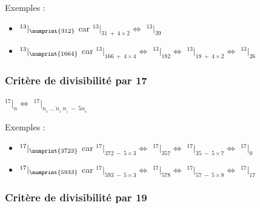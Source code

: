 \documentclass[a4paper, twoside]{article}
\begin{document}
	{ \parindent=0.5cm Exemples : }

	\begin{Large}
	\begin{itemize}

		\item[] $ ^{13}|_{\numprint{312}}$ {\normalsize car} $^{13}|_{31~+~4\times2} \Leftrightarrow$ $^{13}|_{39}$
		\item[] $ ^{13}|_{\numprint{1664}}$ {\normalsize car} $^{13}|_{166~+~4\times4} \Leftrightarrow$ $^{13}|_{182} \Leftrightarrow$ $^{13}|_{18~+~4\times2} \Leftrightarrow$ $^{13}|_{26} $\\

	\end{itemize}
	\end{Large}

	\newpage








	\subsubsection*{Critère de divisibilité par 17}

	\begin{center}
		\huge
		$ ^{17}|_n \Leftrightarrow$ $^{17}|_{\overline{n_{_{k}}~\dots~n_{_2}~n_{_1}}~-~5n_{_0}} $
	\end{center}

	{ \parindent=0.5cm Exemples : }

	\begin{Large}
	\begin{itemize}

		\item[] $ ^{17}|_{\numprint{3723}}$ {\normalsize car} $^{17}|_{372~-~5\times3} \Leftrightarrow$ $^{17}|_{357} \Leftrightarrow$ $^{17}|_{35~-~5\times7} \Leftrightarrow$ $^{17}|_{0}$
		\item[] $ ^{17}|_{\numprint{5933}}$ {\normalsize car} $^{17}|_{593~-~5\times3} \Leftrightarrow$ $^{17}|_{578} \Leftrightarrow$ $^{17}|_{57~-~5\times8} \Leftrightarrow$ $^{17}|_{17} $\\

	\end{itemize}
	\end{Large}

	\vfill
	{\noindent \dotfill}


	\subsubsection*{Critère de divisibilité par 19}
\end{document}
